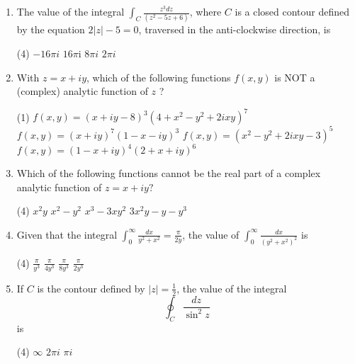 \begin{enumerate}[label=\color{ocre}\textbf{\arabic*.}]
	\item The value of the integral $\int_{C} \frac{z^{3} d z}{\left(z^{2}-5 z+6\right)}$, where $C$ is a closed contour defined by the equation $2|z|-5=0$, traversed in the anti-clockwise direction, is
	{}
	\begin{tasks}(4)
		\task[\textbf{A.}] $-16 \pi i$
		\task[\textbf{B.}] $16 \pi \mathrm{i}$
		\task[\textbf{C.}] $8 \pi i$
		\task[\textbf{D.}] $2 \pi i$
	\end{tasks}
	
	\item  With $z=x+i y$, which of the following functions $f(x, y)$ is NOT a (complex) analytic function of $z$ ?
	{}
	\begin{tasks}(1)
		\task[\textbf{A.}] $f(x, y)=(x+i y-8)^{3}\left(4+x^{2}-y^{2}+2 i x y\right)^{7}$
		\task[\textbf{B.}] $f(x, y)=(x+i y)^{7}(1-x-i y)^{3}$
		\task[\textbf{C.}] $f(x, y)=\left(x^{2}-y^{2}+2 i x y-3\right)^{5}$
		\task[\textbf{D.}] $f(x, y)=(1-x+i y)^{4}(2+x+i y)^{6}$
	\end{tasks}

	\item  Which of the following functions cannot be the real part of a complex analytic function of $z=x+i y ?$
	{}
	\begin{tasks}(4)
		\task[\textbf{A.}] $x^{2} y$
		\task[\textbf{B.}]  $x^{2}-y^{2}$
		\task[\textbf{C.}] $x^{3}-3 x y^{2}$
		\task[\textbf{D.}] $3 x^{2} y-y-y^{3}$
	\end{tasks}
	
	\item  Given that the integral $\int_{0}^{\infty} \frac{d x}{y^{2}+x^{2}}=\frac{\pi}{2 y}$, the value of $\int_{0}^{\infty} \frac{d x}{\left(y^{2}+x^{2}\right)^{2}}$ is
	{}
	\begin{tasks}(4)
		\task[\textbf{A.}] $\frac{\pi}{y^{3}}$
		\task[\textbf{B.}] $\frac{\pi}{4 y^{3}}$
		\task[\textbf{C.}]  $\frac{\pi}{8 y^{3}}$
		\task[\textbf{D.}] $\frac{\pi}{2 y^{3}}$
	\end{tasks}

	\item If $C$ is the contour defined by $|z|=\frac{1}{2}$, the value of the integral
	$$
	\oint_{C} \frac{d z}{\sin ^{2} z}
	$$
	is
	{}
	\begin{tasks}(4)
		\task[\textbf{A.}] $\infty$
		\task[\textbf{B.}] $2 \pi i$
		\task[\textbf{D.}] $\pi i$
	\end{tasks}


\end{enumerate}
